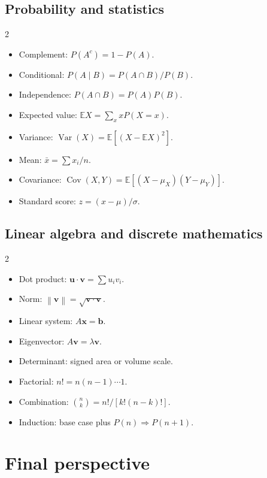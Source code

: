 \documentclass[11pt,oneside,openany]{book}
\newcommand{\vect}[1]{\boldsymbol{#1}}
\newcommand{\norm}[1]{\left\lVert#1\right\rVert}
\begin{document}
\section{Probability and statistics}
\begin{multicols}{2}
\begin{itemize}
  \item Complement: $P(A^c)=1-P(A)$.
  \item Conditional: $P(A\mid B)=P(A\cap B)/P(B)$.
  \item Independence: $P(A\cap B)=P(A)P(B)$.
  \item Expected value: $\mathbb{E}X=\sum_xxP(X=x)$.
  \item Variance: $\operatorname{Var}(X)=\mathbb{E}[(X-\mathbb{E}X)^2]$.
  \item Mean: $\bar x=\sum x_i/n$.
  \item Covariance: $\operatorname{Cov}(X,Y)=\mathbb{E}[(X-\mu_X)(Y-\mu_Y)]$.
  \item Standard score: $z=(x-\mu)/\sigma$.
\end{itemize}
\end{multicols}

\section{Linear algebra and discrete mathematics}
\begin{multicols}{2}
\begin{itemize}
  \item Dot product: $\vect u\cdot\vect v=\sum u_iv_i$.
  \item Norm: $\norm{\vect v}=\sqrt{\vect v\cdot\vect v}$.
  \item Linear system: $A\vect x=\vect b$.
  \item Eigenvector: $A\vect v=\lambda\vect v$.
  \item Determinant: signed area or volume scale.
  \item Factorial: $n!=n(n-1)\cdots1$.
  \item Combination: $\binom{n}{k}=n!/[k!(n-k)!]$.
  \item Induction: base case plus $P(n)\Rightarrow P(n+1)$.
\end{itemize}
\end{multicols}

\chapter*{Final perspective}
\end{document}
